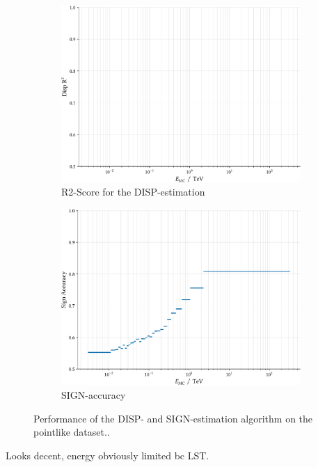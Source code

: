 \begin{figure}
    \begin{subfigure}{0.45\textwidth}
        \includegraphics[width=0.9\linewidth]{../analysis/plots/disp_gamma_mono_lst_r2_equal_filled.pdf} 
        \caption{R2-Score for the DISP-estimation}
    \end{subfigure}
    \begin{subfigure}{0.45\textwidth}
        \includegraphics[width=0.9\linewidth]{../analysis/plots/disp_gamma_mono_lst_acc_equal_filled.pdf}
        \caption{SIGN-accuracy}
    \end{subfigure}
    \caption{Performance of the DISP- and SIGN-estimation algorithm on the pointlike dataset..}
    \label{fig:disp_gamma_perf}
\end{figure}

Looks decent, energy obviously limited bc LST.
